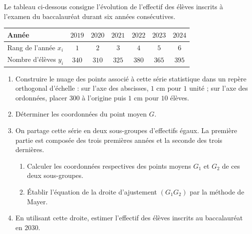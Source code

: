 \begin{commeaubac}
Le tableau ci-dessous consigne l'évolution de l'effectif des élèves inscrits
à l'examen du baccalauréat durant six années consécutives.

\begin{center}\footnotesize
\renewcommand{\arraystretch}{1.25}
\begin{tabular}{|l|c|c|c|c|c|c|}
\hline
Année & $2019$ & $2020$ & $2021$ & $2022$ & $2023$ & $2024$\\
\hline
Rang de l'année $x_{i}$ & $1$ & $2$ & $3$ & $4$ & $5$ & $6$\\
\hline
Nombre d'élèves $y_{i}$ & $340$ & $310$ & $325$ & $380$ & $365$ & $395$\\
\hline
\end{tabular}
\end{center}

\begin{enumerate}[label=\textbf{\arabic*.}, leftmargin=*, itemsep=0.25em]
  \item Construire le nuage des points associé à cette série statistique
        dans un repère orthogonal d'échelle : sur l'axe des abscisses,
        $1$ cm pour $1$ unité ; sur l'axe des ordonnées, placer $300$ à
        l'origine puis $1$ cm pour $10$ élèves. 
  \item Déterminer les coordonnées du point moyen $G$. 
  \item On partage cette série en deux sous-groupes d'effectifs égaux. La
        première partie est composée des trois premières années et la
        seconde des trois dernières.
    \begin{enumerate}[label=\textbf{\alph*)}, leftmargin=1.4em, itemsep=0.15em]
      \item Calculer les coordonnées respectives des points moyens $G_{1}$
            et $G_{2}$ de ces deux sous-groupes. 
      \item Établir l'équation de la droite d'ajustement
            $\left(G_{1}G_{2}\right)$ par la méthode de Mayer.
    \end{enumerate}
  \item En utilisant cette droite, estimer l'effectif des élèves inscrits au
        baccalauréat en $2030$. 
\end{enumerate}
\end{commeaubac}

